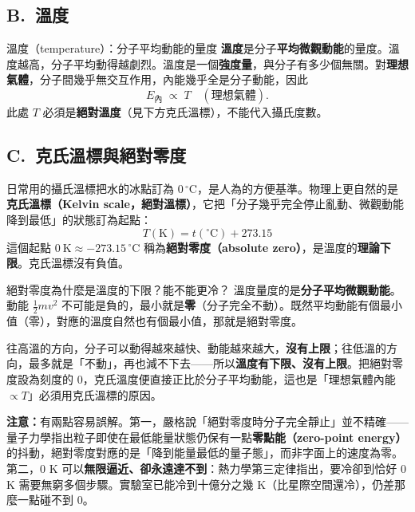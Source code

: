 \documentclass[11pt]{article}
\begin{document}
\subsection*{\sffamily B.\ 溫度}

\begin{補充框}{溫度（temperature）：分子平均動能的量度}
\textbf{溫度}是分子\textbf{平均微觀動能}的量度。溫度越高，分子平均動得越劇烈。溫度是一個\textbf{強度量}，與分子有多少個無關。對\textbf{理想氣體}，分子間幾乎無交互作用，內能幾乎全是分子動能，因此
$$E_{\text{內}}\;\propto\;T\quad(\text{理想氣體}).$$
此處 $T$ 必須是\textbf{絕對溫度}（見下方克氏溫標），不能代入攝氏度數。
\end{補充框}


\subsection*{\sffamily C.\ 克氏溫標與絕對零度}

日常用的攝氏溫標把水的冰點訂為 $0\,^\circ$C，是人為的方便基準。物理上更自然的是\textbf{克氏溫標（Kelvin scale，絕對溫標）}，它把「分子幾乎完全停止亂動、微觀動能降到最低」的狀態訂為起點：
$$\boxed{\;T(\text{K})=t(^\circ\text{C})+273.15\;}$$
這個起點 $0\ \text{K}\approx-273.15\,^\circ$C 稱為\textbf{絕對零度（absolute zero）}，是溫度的\textbf{理論下限}。克氏溫標沒有負值。

\begin{補充框}{絕對零度為什麼是溫度的下限？能不能更冷？}
溫度量度的是\textbf{分子平均微觀動能}。動能 $\tfrac12mv^2$ 不可能是負的，最小就是\textbf{零}（分子完全不動）。既然平均動能有個最小值（零），對應的溫度自然也有個最小值，那就是絕對零度。

往高溫的方向，分子可以動得越來越快、動能越來越大，\textbf{沒有上限}；往低溫的方向，最多就是「不動」，再也減不下去——所以\textbf{溫度有下限、沒有上限}。把絕對零度設為刻度的 0，克氏溫度便直接正比於分子平均動能，這也是「理想氣體內能 $\propto T$」必須用克氏溫標的原因。

\textbf{注意：}有兩點容易誤解。第一，嚴格說「絕對零度時分子完全靜止」並不精確——量子力學指出粒子即使在最低能量狀態仍保有一點\textbf{零點能（zero-point energy）}的抖動，絕對零度對應的是「降到能量最低的量子態」，而非字面上的速度為零。第二，0 K 可以\textbf{無限逼近、卻永遠達不到}：熱力學第三定律指出，要冷卻到恰好 0 K 需要無窮多個步驟。實驗室已能冷到十億分之幾 K（比星際空間還冷），仍差那麼一點碰不到 0。
\end{補充框}
\end{document}
